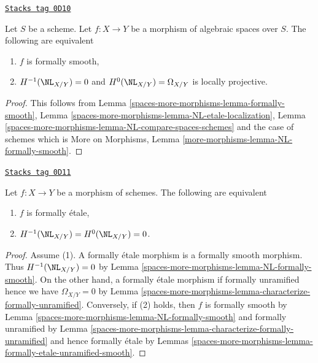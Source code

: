 \begin{lemma}
\label{spaces-more-morphisms-lemma-NL-formally-smooth}
\href{https://stacks.math.columbia.edu/tag/0D10}{\texttt{Stacks tag 0D10}}

Let $S$ be a scheme.
Let $f : X \to Y$ be a morphism of algebraic spaces over $S$.
The following are equivalent
\begin{enumerate}
\item $f$ is formally smooth,
\item $H^{-1}(\NL_{X/Y}) = 0$ and $H^0(\NL_{X/Y}) = \Omega_{X/Y}$
is locally projective.
\end{enumerate}
\end{lemma}

\begin{proof}
This follows from
Lemma \ref{spaces-more-morphisms-lemma-formally-smooth},
Lemma \ref{spaces-more-morphisms-lemma-NL-etale-localization},
Lemma \ref{spaces-more-morphisms-lemma-NL-compare-spaces-schemes}
and the case of schemes which is
More on Morphisms, Lemma \ref{more-morphisms-lemma-NL-formally-smooth}.
\end{proof}

\begin{lemma}
\label{spaces-more-morphisms-lemma-NL-formally-etale}
\href{https://stacks.math.columbia.edu/tag/0D11}{\texttt{Stacks tag 0D11}}

Let $f : X \to Y$ be a morphism of schemes. The following are equivalent
\begin{enumerate}
\item $f$ is formally \'etale,
\item $H^{-1}(\NL_{X/Y}) = H^0(\NL_{X/Y}) = 0$.
\end{enumerate}
\end{lemma}

\begin{proof}
Assume (1). A formally \'etale morphism is a formally smooth morphism.
Thus $H^{-1}(\NL_{X/Y}) = 0$ by Lemma \ref{spaces-more-morphisms-lemma-NL-formally-smooth}.
On the other hand, a formally \'etale morphism if formally unramified
hence we have $\Omega_{X/Y} = 0$ by
Lemma \ref{spaces-more-morphisms-lemma-characterize-formally-unramified}.
Conversely, if (2) holds, then $f$ is formally smooth by
Lemma \ref{spaces-more-morphisms-lemma-NL-formally-smooth}
and formally unramified by
Lemma \ref{spaces-more-morphisms-lemma-characterize-formally-unramified}
and hence formally \'etale by
Lemmas \ref{spaces-more-morphisms-lemma-formally-etale-unramified-smooth}.
\end{proof}

